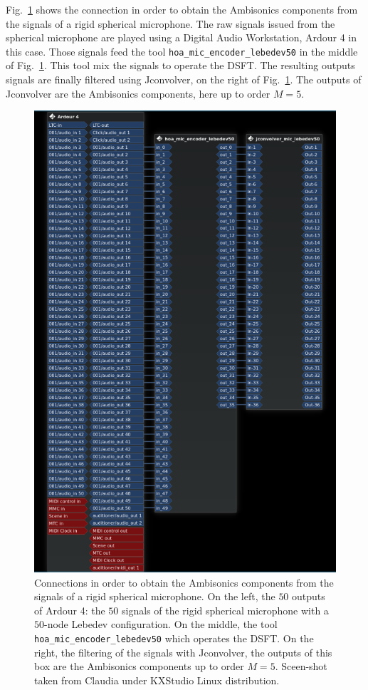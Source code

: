 \documentclass[10pt,a4paper]{article}
\begin{document}
Fig.~\ref{fig:hoa_mic_encoder_2} shows the connection in order to obtain the Ambisonics components from the signals of a rigid spherical microphone. The raw signals issued from the spherical microphone are played using a Digital Audio Workstation, Ardour 4 in this case. Those signals feed the tool \lstinline'hoa_mic_encoder_lebedev50' in the middle of Fig.~\ref{fig:hoa_mic_encoder_2}. This tool mix the signals to operate the DSFT. The resulting outputs signals are finally filtered using Jconvolver, on the right of Fig.~\ref{fig:hoa_mic_encoder_2}. The outputs of Jconvolver are the Ambisonics components, here up to order $M=5$.
\begin{figure}[!ht]
\centering
\includegraphics[width=0.65\columnwidth]{hoa_mic_encoder_2.png}
\caption{Connections in order to obtain the Ambisonics components from the signals of a rigid spherical microphone. On the left, the $50$ outputs of Ardour 4: the $50$ signals of the rigid spherical microphone with a $50$-node Lebedev configuration. On the middle, the tool \lstinline'hoa_mic_encoder_lebedev50' which operates the DSFT. On the right, the filtering of the signals with Jconvolver, the outputs of this box are the Ambisonics components up to order $M=5$. Sceen-shot taken from Claudia under KXStudio Linux distribution.}
\label{fig:hoa_mic_encoder_2}
\end{figure}
\clearpage
\pagebreak
\end{document}
